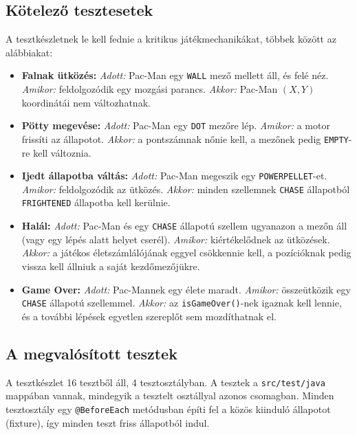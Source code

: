 \documentclass[11pt, a4paper]{article}
\begin{document}
\subsection*{Kötelező tesztesetek}
A tesztkészletnek le kell fednie a kritikus játékmechanikákat, többek között az alábbiakat:
\begin{itemize}
    \item \textbf{Falnak ütközés:} \textit{Adott:} Pac-Man egy \texttt{WALL} mező mellett áll, és felé néz. \textit{Amikor:} feldolgozódik egy mozgási parancs. \textit{Akkor:} Pac-Man $(X, Y)$ koordinátái nem változhatnak.
    \item \textbf{Pötty megevése:} \textit{Adott:} Pac-Man egy \texttt{DOT} mezőre lép. \textit{Amikor:} a motor frissíti az állapotot. \textit{Akkor:} a pontszámnak nőnie kell, a mezőnek pedig \texttt{EMPTY}-re kell változnia.
    \item \textbf{Ijedt állapotba váltás:} \textit{Adott:} Pac-Man megeszik egy \texttt{POWERPELLET}-et. \textit{Amikor:} feldolgozódik az ütközés. \textit{Akkor:} minden szellemnek \texttt{CHASE} állapotból \texttt{FRIGHTENED} állapotba kell kerülnie.
    \item \textbf{Halál:} \textit{Adott:} Pac-Man és egy \texttt{CHASE} állapotú szellem ugyanazon a mezőn áll (vagy egy lépés alatt helyet cserél). \textit{Amikor:} kiértékelődnek az ütközések. \textit{Akkor:} a játékos életszámlálójának eggyel csökkennie kell, a pozícióknak pedig vissza kell állniuk a saját kezdőmezőjükre.
    \item \textbf{Game Over:} \textit{Adott:} Pac-Mannek egy élete maradt. \textit{Amikor:} összeütközik egy \texttt{CHASE} állapotú szellemmel. \textit{Akkor:} az \texttt{isGameOver()}-nek igaznak kell lennie, és a további lépések egyetlen szereplőt sem mozdíthatnak el.
\end{itemize}

\subsection*{A megvalósított tesztek}
A tesztkészlet 16 tesztből áll, 4 tesztosztályban. A tesztek a \texttt{src/test/java} mappában vannak, mindegyik a tesztelt osztállyal azonos csomagban. Minden tesztosztály egy \texttt{@BeforeEach} metódusban építi fel a közös kiinduló állapotot (fixture), így minden teszt friss állapotból indul.
\end{document}
